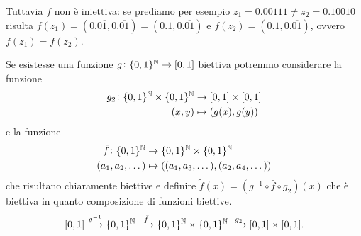 \documentclass[a4paper]{article}\par \usepackage{style}\par
\begin{document}
Tuttavia $ f $ non è iniettiva: se prediamo per esempio $ z_1 = 0.0\overline{0111} \neq z_2 = 0.1\overline{0010} $ risulta $ f(z_1) = (0.0\overline{1}, 0.\overline{01}) = (0.1, 0.\overline{01}) $ e $ f(z_2) = (0.1, 0.\overline{01}) $, ovvero $ f(z_1) = f(z_2) $. \\\par Se esistesse una funzione $ g \colon \{0, 1\}^{\mathbb{N}} \to [0, 1] $ biettiva potremmo considerare la funzione
\begin{align*}
  g_2 \colon \{0, 1\}^{\mathbb{N}} \times \{0, 1\}^{\mathbb{N}} & \to [0, 1] \times [0, 1] \\
  (x, y) & \mapsto (g(x), g(y))
\end{align*}
e la funzione
\begin{align*}
  \bar{f} \colon \{0, 1\}^{\mathbb{N}} & \to \{0, 1\}^{\mathbb{N}} \times \{0, 1\}^{\mathbb{N}} \\
  (a_1, a_2, \dots ) & \mapsto ((a_1, a_3, \dots), (a_2, a_4, \dots))
\end{align*}
che risultano chiaramente biettive e definire $ \tilde{f}(x) = (g^{-1} \circ \bar{f} \circ g_2)(x) $ che è biettiva in quanto composizione di funzioni biettive.
\[[0, 1] \overset{g^{-1}}\longrightarrow \{0, 1\}^{\mathbb{N}} \overset{\bar{f}}\longrightarrow \{0, 1\}^{\mathbb{N}} \times \{0, 1\}^{\mathbb{N}} \overset{g_2}\longrightarrow [0, 1] \times [0, 1].\]
\end{document}
